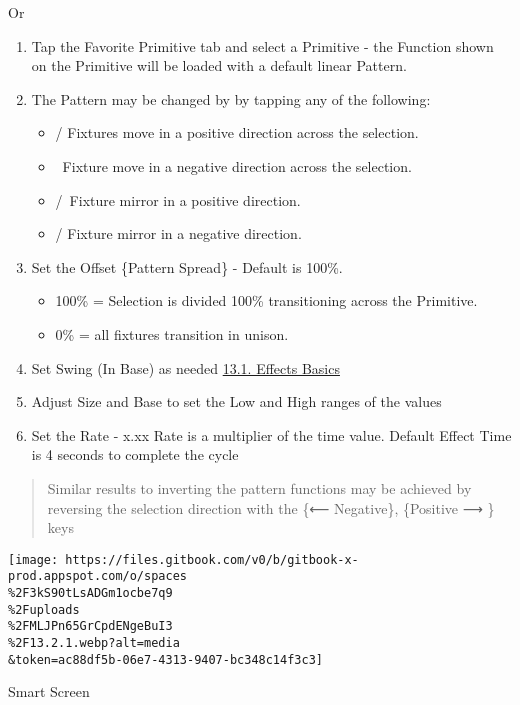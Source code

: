 \documentclass[
]{article}
\begin{document}
{Or }

\begin{enumerate}
\def\labelenumi{\arabic{enumi}.}
\setcounter{enumi}{4}
\item
  Tap the Favorite Primitive tab and select a Primitive - the Function shown on the Primitive will be loaded with a default linear Pattern.
\item
  The Pattern may be changed by by tapping any of the following:

  \begin{itemize}
  \item
    / Fixtures move in a positive direction across the selection.
  \item
    ~Fixture move in a negative direction across the selection.
  \item
    /~Fixture mirror in a positive direction.
  \item
    / Fixture mirror in a negative direction.
  \end{itemize}
\item
  Set the Offset \{Pattern Spread\} - Default is 100\%.

  \begin{itemize}
  \item
    100\% = Selection is divided 100\% transitioning across the Primitive.
  \item
    0\% = all fixtures transition in unison.
  \end{itemize}
\item
  Set Swing (In Base) as needed \href{https://vibemanual.compulite.com/effects-1.html\#effect-basics}{13.1. Effects Basics}
\item
  Adjust Size and Base to set the Low and High ranges of the values
\item
  Set the Rate - x.xx Rate is a multiplier of the time value. Default Effect Time is 4 seconds to complete the cycle
\end{enumerate}

\begin{quote}
Similar results to inverting the pattern functions may be achieved by reversing the selection direction with the \{⟵ Negative\}, \{Positive ⟶ \} keys
\end{quote}

\texttt{[image: https://files.gitbook.com/v0/b/gitbook-x-prod.appspot.com/o/spaces\\\%2F3kS90tLsADGm1ocbe7q9\\\%2Fuploads\\\%2FMLJPn65GrCpdENgeBuI3\\\%2F13.2.1.webp?alt=media\\\&token=ac88df5b-06e7-4313-9407-bc348c14f3c3]}

Smart Screen
\end{document}
